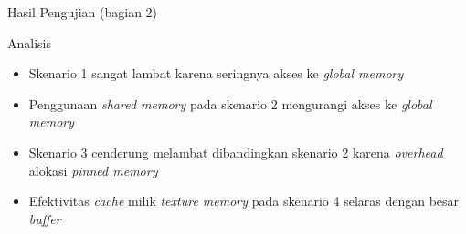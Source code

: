 \documentclass[10pt,xcolor=table]{beamer}
\begin{document}
\begin{frame}{Hasil Pengujian (bagian 2)}
    \begin {table}[h]   
        \begin{center}
        \end{center}
    \end{table}
\end{frame}

\begin{frame}{Analisis}
    \begin{itemize}
        \item Skenario 1 sangat lambat karena seringnya akses ke \emph{global memory}
        \item Penggunaan \emph{shared memory} pada skenario 2 mengurangi akses ke \emph{global memory}
        \item Skenario 3 cenderung melambat dibandingkan skenario 2 karena \emph{overhead} alokasi \emph{pinned memory}
        \item Efektivitas \emph{cache} milik \emph{texture memory} pada skenario 4 selaras dengan besar \emph{buffer}
    \end{itemize}
\end{frame}
\end{document}
